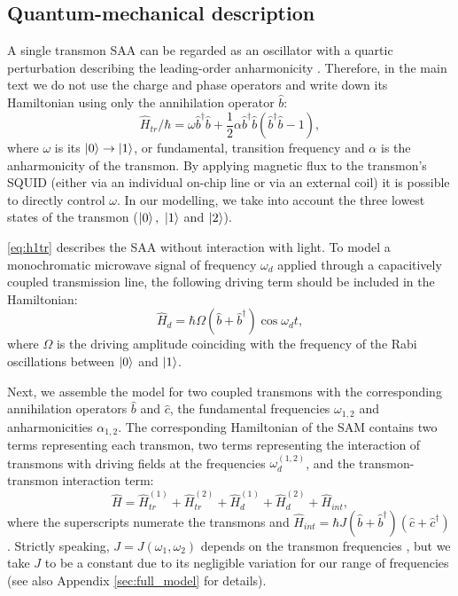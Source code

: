 \documentclass[%
 aps, prx,
 amsmath,amssymb,
 reprint,%
superscriptaddress
]{revtex4-2}
\begin{document}
\subsection{Quantum-mechanical description}

A single transmon SAA can be regarded as an 
oscillator with a quartic perturbation describing 
the leading-order anharmonicity \cite{koch2007charge, yan2018tunable}. Therefore, in 
the main text we do not use the charge and phase 
operators and write down its Hamiltonian using 
only the annihilation operator $\hat b$:
\begin{equation}
\hat{{H}}_{tr}/\hbar = \omega \hat 
b^{\dagger}\hat b +\frac{1}{2}\alpha \hat 
b^{\dagger}\hat b(\hat b^{\dagger}\hat b-1),
\label{eq:h1tr}
\end{equation}
where $\omega$ is its 
$\ket{0}\rightarrow\ket{1}$, or fundamental, 
transition frequency and $\alpha$ is the 
anharmonicity of the transmon. By applying 
magnetic flux to the transmon's SQUID (either via 
an individual on-chip line or via an external 
coil) it is possible \cite{koch2007charge} to 
directly  control $\omega$. In our modelling, we 
take into account the three lowest states of the 
transmon ($\ket{0},\ \ket{1}$ and $\ket{2}$).

\autoref{eq:h1tr} describes the SAA without 
interaction with light. To model a monochromatic 
microwave signal of frequency $\omega_d$ applied 
through a capacitively coupled transmission line, 
the following driving term should be included in 
the Hamiltonian:
\begin{equation}
\hat H_{d} = \hbar \Omega (\hat b+\hat b^{\dagger}) \cos\omega_d t,
\end{equation}
where $\Omega$ is the driving amplitude coinciding with the frequency of the Rabi oscillations between $\ket{0}$ and $\ket{1}$.

Next, we assemble the model for two coupled 
transmons with the corresponding annihilation 
operators $\hat b$ and $\hat c$, the fundamental 
frequencies $\omega_{1,2}$ and anharmonicities 
$\alpha_{1,2}$. The corresponding Hamiltonian of 
the SAM contains two terms representing each 
transmon, two terms representing the interaction 
of transmons with driving fields at the 
frequencies $\omega_d^{(1,2)}$, and the 
transmon-transmon interaction term:
\begin{equation}\label{Hsystem}
\hat H = \hat H_{tr}^{(1)}+\hat H_{tr}^{(2)}+\hat H_{d}^{(1)}+\hat H_{d}^{(2)}+\hat H_{int},
\end{equation}
where the superscripts numerate the transmons and $\hat H_{int} = \hbar J (\hat b +\hat 
b^\dag)(\hat c+\hat c^{\dagger})$. 
Strictly speaking, $J = J(\omega_1, \omega_2)$ 
depends on the transmon 
frequencies \cite{koch2007charge}, but we take $J$ 
to be a constant due to its negligible variation for our range of frequencies (see also Appendix \ref{sec:full_model} for details).
\end{document}
